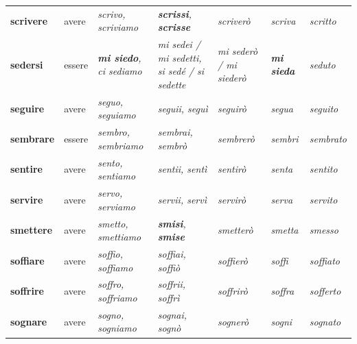 \documentclass[11pt,a4paper,twoside,openright]{book}
\newcommand{\irr}[1]{{\color{exccol}\bfseries #1}}
\begin{document}
{\begin{xltabular}{\linewidth}{@{}>{\raggedright\arraybackslash}p{2.7cm} l L L l >{\raggedright\arraybackslash}p{1.9cm} l@{}}
\textbf{scrivere} & avere & \textit{scrivo, scriviamo} & \textit{\irr{scrissi}, \irr{scrisse}} & \textit{scriverò} & \textit{scriva} & \textit{scritto} \\
\textbf{sedersi} & essere & \textit{\irr{mi siedo}, ci sediamo} & \textit{mi sedei / mi sedetti, si sedé / si sedette} & \textit{mi sederò / mi siederò} & \textit{\irr{mi sieda}} & \textit{seduto} \\
\textbf{seguire} & avere & \textit{seguo, seguiamo} & \textit{seguii, seguì} & \textit{seguirò} & \textit{segua} & \textit{seguito} \\
\textbf{sembrare} & essere & \textit{sembro, sembriamo} & \textit{sembrai, sembrò} & \textit{sembrerò} & \textit{sembri} & \textit{sembrato} \\
\textbf{sentire} & avere & \textit{sento, sentiamo} & \textit{sentii, sentì} & \textit{sentirò} & \textit{senta} & \textit{sentito} \\
\textbf{servire} & avere & \textit{servo, serviamo} & \textit{servii, servì} & \textit{servirò} & \textit{serva} & \textit{servito} \\
\textbf{smettere} & avere & \textit{smetto, smettiamo} & \textit{\irr{smisi}, \irr{smise}} & \textit{smetterò} & \textit{smetta} & \textit{smesso} \\
\textbf{soffiare} & avere & \textit{soffio, soffiamo} & \textit{soffiai, soffiò} & \textit{soffierò} & \textit{soffi} & \textit{soffiato} \\
\textbf{soffrire} & avere & \textit{soffro, soffriamo} & \textit{soffrii, soffrì} & \textit{soffrirò} & \textit{soffra} & \textit{sofferto} \\
\textbf{sognare} & avere & \textit{sogno, sogniamo} & \textit{sognai, sognò} & \textit{sognerò} & \textit{sogni} & \textit{sognato} \\

\end{xltabular}}
\end{document}
